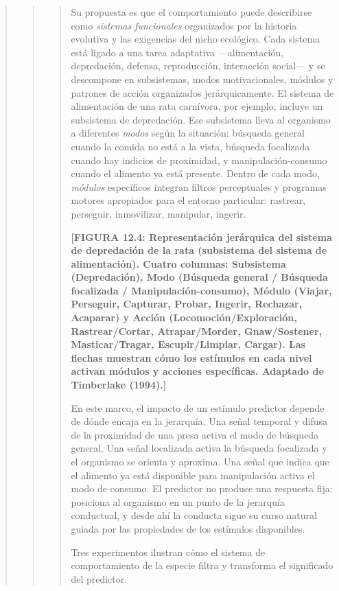 \documentclass[
  letterpaper,
  DIV=11,
  numbers=noendperiod]{scrreprt}
\begin{document}
\begin{tcolorbox}[enhanced jigsaw, arc=.35mm, bottomrule=.15mm, breakable, colback=white, colframe=quarto-callout-note-color-frame, left=2mm, leftrule=.75mm, opacityback=0, rightrule=.15mm, toprule=.15mm]
\begin{quote}
\begin{quote}
\begin{quote}
Su propuesta es que el comportamiento puede describirse como
\emph{sistemas funcionales} organizados por la historia evolutiva y las
exigencias del nicho ecológico. Cada sistema está ligado a una tarea
adaptativa ---alimentación, depredación, defensa, reproducción,
interacción social--- y se descompone en subsistemas, modos
motivacionales, módulos y patrones de acción organizados
jerárquicamente. El sistema de alimentación de una rata carnívora, por
ejemplo, incluye un subsistema de depredación. Ese subsistema lleva al
organismo a diferentes \emph{modos} según la situación: búsqueda general
cuando la comida no está a la vista, búsqueda focalizada cuando hay
indicios de proximidad, y manipulación-consumo cuando el alimento ya
está presente. Dentro de cada modo, \emph{módulos} específicos integran
filtros perceptuales y programas motores apropiados para el entorno
particular: rastrear, perseguir, inmovilizar, manipular, ingerir.

\textbf{{[}FIGURA 12.4: Representación jerárquica del sistema de
depredación de la rata (subsistema del sistema de alimentación). Cuatro
columnas: Subsistema (Depredación), Modo (Búsqueda general / Búsqueda
focalizada / Manipulación-consumo), Módulo (Viajar, Perseguir, Capturar,
Probar, Ingerir, Rechazar, Acaparar) y Acción (Locomoción/Exploración,
Rastrear/Cortar, Atrapar/Morder, Gnaw/Sostener, Masticar/Tragar,
Escupir/Limpiar, Cargar). Las flechas muestran cómo los estímulos en
cada nivel activan módulos y acciones específicas. Adaptado de
Timberlake (1994).{]}}

En este marco, el impacto de un estímulo predictor depende de dónde
encaja en la jerarquía. Una señal temporal y difusa de la proximidad de
una presa activa el modo de búsqueda general. Una señal localizada
activa la búsqueda focalizada y el organismo se orienta y aproxima. Una
señal que indica que el alimento ya está disponible para manipulación
activa el modo de consumo. El predictor no produce una respuesta fija:
posiciona al organismo en un punto de la jerarquía conductual, y desde
ahí la conducta sigue su curso natural guiada por las propiedades de los
estímulos disponibles.

Tres experimentos ilustran cómo el sistema de comportamiento de la
especie filtra y transforma el significado del predictor.


\end{quote}
\end{quote}
\end{quote}
\end{tcolorbox}
\end{document}

